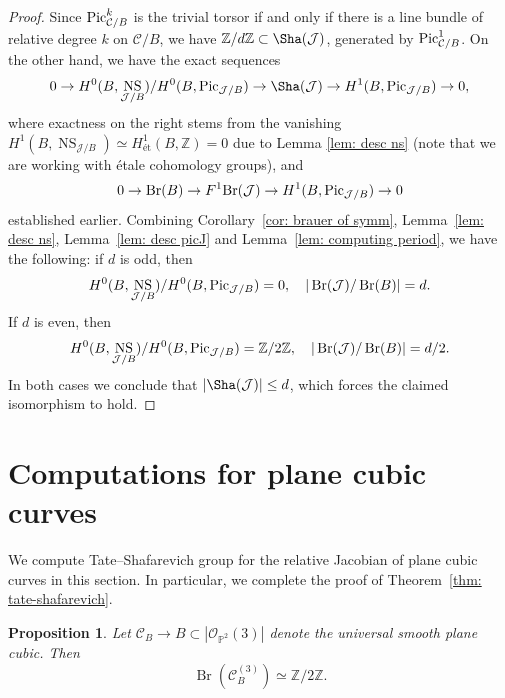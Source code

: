 \documentclass[11pt]{amsart}
\theoremstyle{plain}
\newtheorem{prop}[thm]{Proposition}
\theoremstyle{definition}
\theoremstyle{remark}
\DeclareMathOperator{\Br}{Br}
\newcommand{\Pic}{\mathop{\rm Pic}\nolimits}
\DeclareMathOperator{\NS}{NS}
\begin{document}
\begin{proof}
Since $\Pic^k_{\mathcal C / B}$ is the trivial torsor if and only if there is a line bundle of relative degree $k$ on $\mathcal C/B$, we have $\mathbb Z / d \mathbb Z \subset \Sha(\mathcal{J})$, generated by $\Pic^1_{\mathcal C / B}$. On the other hand, we have the exact sequences
$$0 \to H^0(B, \NS_{\mathcal{J} / B}) / H^0(B, \Pic_{\mathcal{J}/B})\to \Sha(\mathcal{J}) \to H^1(B, \Pic_{\mathcal{J} / B}) \to 0,$$
where exactness on the right stems from the vanishing
$H^1(B, \NS_{\mathcal J / B}) \simeq H^1_{\text{\'et}}(B, \mathbb Z) = 0$ due to Lemma \ref{lem: desc ns} (note that we are working with \'etale cohomology groups),
and
$$0 \to \Br(B) \to F^1 \mathrm{Br}(\mathcal{J}) \to H^1(B, \Pic_{\mathcal{J} / B}) \to 0$$
established earlier.
Combining Corollary~\ref{cor: brauer of symm}, Lemma~\ref{lem: desc ns}, Lemma~\ref{lem: desc picJ} and Lemma~\ref{lem: computing period}, we have the following:
if $d$ is odd, then
\[
H^0(B, \NS_{\mathcal{J} / B}) / H^0(B, \Pic_{\mathcal{J}/B}) = 0, \quad |\Br(\mathcal{J}) / \Br(B)| = d.
\]
If $d$ is even, then
\[
H^0(B, \NS_{\mathcal{J} / B}) / H^0(B, \Pic_{\mathcal{J}/B}) = \mathbb Z / 2 \mathbb Z, \quad |\Br(\mathcal{J}) / \Br(B)| = d/2.
\]
In both cases we conclude that $|\Sha(\mathcal{J})| \leq d$, which forces the claimed isomorphism to hold.
\end{proof}


\section{Computations for plane cubic curves}
\label{sec: appendix cubics}

We compute Tate--Shafarevich group for the relative Jacobian of plane cubic curves in this section. In particular, we complete the proof of Theorem~\ref{thm: tate-shafarevich}.

\begin{prop}\label{prop: appendix}
    Let $\mathcal C_B \to B \subset |\mathcal O_{\mathbb P^2}(3)|$ denote the universal smooth plane cubic. Then
    $$\Br(\mathcal C^{(3)}_B) \simeq \mathbb Z/ 2 \mathbb Z.$$
\end{prop}
\end{document}
